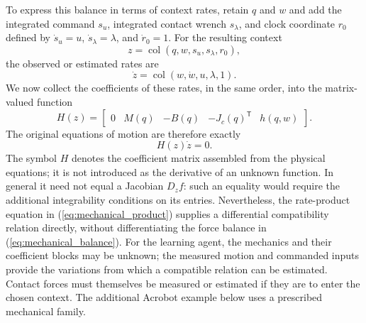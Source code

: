 \documentclass[journal]{IEEEtran}
\newcommand{\func}[1]{\operatorname{#1}}
\begin{document}
To express this balance in terms of context rates, retain $q$ and $w$ and
add the integrated command $s_u$, integrated contact wrench $s_\lambda$, and
clock coordinate $r_0$ defined by $\dot s_u=u$, $\dot s_\lambda=\lambda$,
and $\dot r_0=1$. For the resulting context 
\begin{equation}
z=\func{col}(q,w,s_u,s_\lambda,r_0),  \label{eq:mechanical_context}
\end{equation}
the observed or estimated rates are 
\begin{equation}
\dot z=\func{col}(w,\dot w,u,\lambda,1).  \label{eq:mechanical_rates}
\end{equation}
We now collect the coefficients of these rates, in the same order, into the
matrix-valued function 
\begin{equation}
H(z)=%
\begin{bmatrix}
0 & M(q) & -B(q) & -J_c(q)^{\mathsf{T}} & h(q,w)%
\end{bmatrix}%
.  \label{eq:mechanical_coefficients}
\end{equation}
The original equations of motion are therefore exactly 
\begin{equation}
H(z)\dot z=0.  \label{eq:mechanical_product}
\end{equation}
The symbol $H$ denotes the coefficient matrix assembled from the physical
equations; it is not introduced as the derivative of an unknown function. In
general it need not equal a Jacobian $D_zf$: such an equality would require
the additional integrability conditions on its entries. Nevertheless, the
rate-product equation in (\ref{eq:mechanical_product}) supplies a
differential compatibility relation directly, without differentiating the
force balance in (\ref{eq:mechanical_balance}). For the learning agent, the
mechanics and their coefficient blocks may be unknown; the measured motion
and commanded inputs provide the variations from which a compatible relation
can be estimated. Contact forces must themselves be measured or estimated if
they are to enter the chosen context. The additional Acrobot example below uses a prescribed mechanical family.
%
\end{document}
